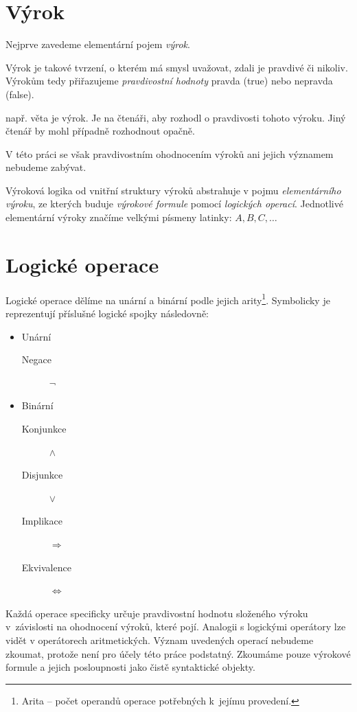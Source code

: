 \documentclass[thesis=B,czech,hidelinks]{thesis}[2012/06/26]
\begin{document}
\section{Výrok}

Nejprve zavedeme elementární pojem \emph{výrok}.

Výrok je takové tvrzení, o kterém má smysl uvažovat, zdali je pravdivé či nikoliv. Výrokům tedy přiřazujeme \emph{pravdivostní hodnoty} pravda (true) nebo nepravda (false)\cite{sochor}.

\begin{exm}
např. věta  je výrok. Je na čtenáři, aby rozhodl o pravdivosti tohoto výroku. Jiný čtenář by mohl případně rozhodnout opačně.
\end{exm}
 
V této práci se však pravdivostním ohodnocením výroků ani jejich významem nebudeme zabývat.

Výroková logika od vnitřní struktury výroků abstrahuje v pojmu \emph{elementárního výroku}, ze kterých buduje \emph{výrokové formule} pomocí \emph{logických operací}. Jednotlivé elementární výroky značíme velkými písmeny latinky: $A, B, C, \ldots$

\section{Logické operace}

Logické operace dělíme na unární a binární podle jejich arity\footnote{Arita -- počet operandů operace potřebných k~jejímu provedení.}. Symbolicky je reprezentují příslušné logické spojky následovně:

\begin{itemize}
	\item Unární
	\begin{description}
		\item[Negace] $\neg$
	\end{description}
	\item Binární
	\begin{description}
		\item[Konjunkce] $\wedge$
		\item[Disjunkce] $\vee$
		\item[Implikace] $\Rightarrow$
		\item[Ekvivalence] $\Leftrightarrow$
	\end{description}
\end{itemize}

Každá operace specificky určuje pravdivostní hodnotu složeného výroku v~závislosti na ohodnocení výroků, které pojí. Analogii s logickými operátory lze vidět v operátorech aritmetických. Význam uvedených operací nebudeme zkoumat, protože není pro účely této práce podstatný. Zkoumáme pouze výrokové formule a jejich posloupnosti jako čistě syntaktické objekty.
\end{document}
